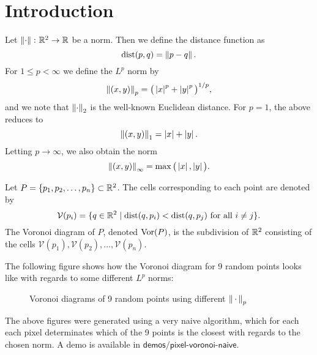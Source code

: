 \section{Introduction}
Let $\left\lVert \cdot \right\rVert \colon \mathbb{R}^2 \to \mathbb{R}$ be a norm. Then we define the distance function as
\begin{equation}
    \operatorname{dist}(p, q) = \left\lVert p - q \right\rVert.
\end{equation}
For $1 \leq p < \infty$ we define the $L^p$ norm by
\begin{equation}
    \left\lVert (x, y) \right\rVert_p = {\big(\left\lvert x \right\rvert^p + \left\lvert y \right\rvert^p\big)}^{1/p},
\end{equation}
and we note that $\left\lVert  \cdot  \right\rVert_2$ is the well-known Euclidean distance. For $p = 1$, the above reduces to
\begin{equation}
    \left\lVert (x, y) \right\rVert_1 = \left\lvert x \right\rvert + \left\lvert y \right\rvert.
\end{equation}
Letting $p \to \infty$, we also obtain the norm
\begin{equation}
    \left\lVert (x, y) \right\rVert_{\infty} = \max\big(\left\lvert x \right\rvert, \left\lvert y \right\rvert\big).
\end{equation}
\begin{defn}
Let $P = \{p_1, p_2, \ldots, p_n\} \subset \mathbb{R}^2$. The cells corresponding to each point are denoted by
\[
    \mathcal{V}(p_i) = \{q \in \mathbb{R}^2 \mid \operatorname{dist}(q, p_i) < \operatorname{dist}(q, p_j) \text{ for all } i \ne j\}.
\]
The Voronoi diagram of $P$, denoted $\operatorname{Vor}(P)$, is the subdivision of $\mathbb{R}^2$ consisting of the cells $\mathcal{V}(p_1), \mathcal{V}(p_2), \ldots, \mathcal{V}(p_n)$.
\end{defn}

The following figure shows how the Voronoi diagram for 9 random points looks like with regards to some different $L^p$ norms:

\begin{figure}[H]
    \centering
    \hspace{0mm}
    \caption{Voronoi diagrams of 9 random points using different $\left\lVert \,\cdot\, \right\rVert_p$}
\end{figure}
The above figures were generated using a very naive algorithm, which for each each pixel determinates which of the 9 points is the closest with regards to the chosen norm. A demo is available in $\boxed{\textsf{demos/pixel-voronoi-naive}}$. \\

